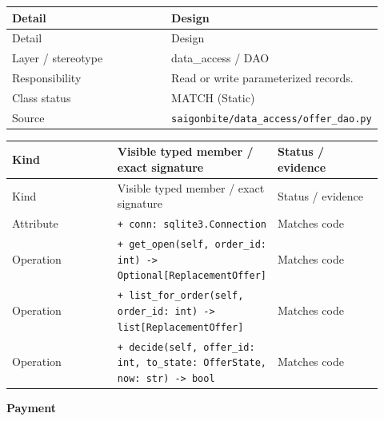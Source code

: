 \begin{longtable}{>{\raggedright\arraybackslash}p{0.4600\linewidth}>{\raggedright\arraybackslash}p{0.4600\linewidth}}
Detail & Design \\
\hline\endfirsthead
Detail & Design \\
\hline\endhead
Layer / stereotype & data\_access / \guillemotleft{}DAO\guillemotright{} \\
Responsibility & Read or write parameterized records. \\
Class status & MATCH (Static) \\
Source & \texttt{saigonbite/\allowbreak{}data\_\allowbreak{}access/\allowbreak{}offer\_\allowbreak{}dao.\allowbreak{}py} \\
\end{longtable}
\begin{longtable}{>{\raggedright\arraybackslash}p{0.3067\linewidth}>{\raggedright\arraybackslash}p{0.3067\linewidth}>{\raggedright\arraybackslash}p{0.3067\linewidth}}
Kind & Visible typed member / exact signature & Status / evidence \\
\hline\endfirsthead
Kind & Visible typed member / exact signature & Status / evidence \\
\hline\endhead
Attribute & \texttt{+ conn: sqlite3.\allowbreak{}Connection} & Matches code \\
Operation & \texttt{+ get\_\allowbreak{}open(self, order\_\allowbreak{}id: int) -\textgreater{} Optional[ReplacementOffer]} & Matches code \\
Operation & \texttt{+ list\_\allowbreak{}for\_\allowbreak{}order(self, order\_\allowbreak{}id: int) -\textgreater{} list[ReplacementOffer]} & Matches code \\
Operation & \texttt{+ decide(self, offer\_\allowbreak{}id: int, to\_\allowbreak{}state: OfferState, now: str) -\textgreater{} bool} & Matches code \\
\end{longtable}
\textbf{Payment}

